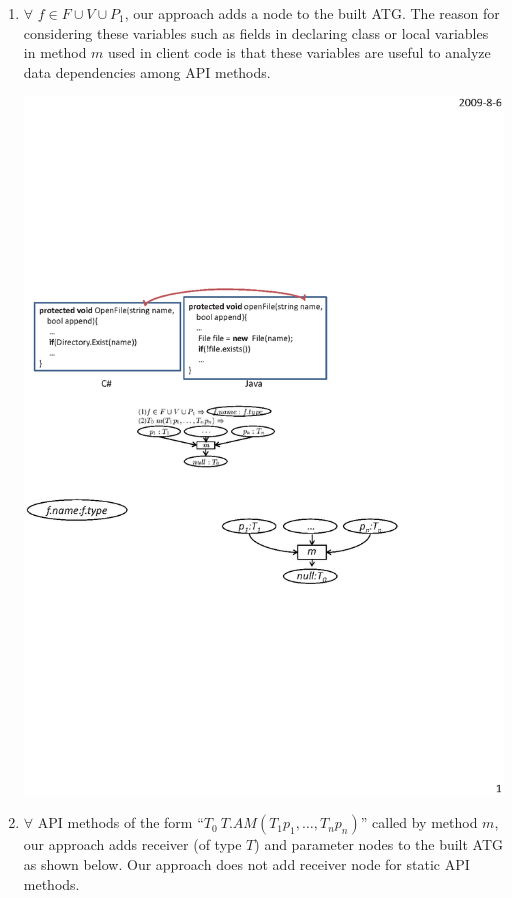 \begin{enumerate}
\item $\forall$ $f \in F \cup V \cup P_1$, our approach adds a node to the built ATG.
The reason for considering these variables such as fields in declaring 
class or local variables in method $m$ used in client code is that
these variables are useful to analyze data dependencies among API methods.

\begin{center}
\includegraphics[scale=0.7,clip]{figure/rule1.eps}
\end{center}

\item $\forall$ API methods of the form ``$T_0\ T.AM (T_1 p_1, \ldots, T_n p_n)$''
called by method $m$, our approach adds receiver (of type $T$)
and parameter nodes to the built ATG as shown below.
Our approach does not add receiver node for static API methods.


\end{enumerate}
